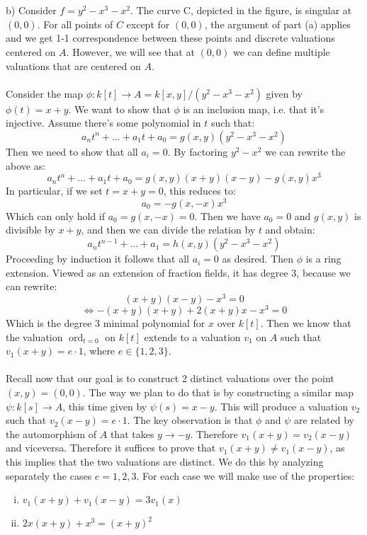 \documentclass[12 pt]{article}
\DeclareMathOperator{\ord}{ord}
\begin{document}
\\
\\
b) Consider $f = y^2 - x^3 - x^2$. The curve C, depicted in the figure, is singular at $(0,0)$. For all points of $C$ except for $(0,0)$, the argument of part (a) applies and we get 1-1 correspondence between these points and discrete valuations centered on $A$. However, we will see that at $(0,0)$ we can define multiple valuations that are centered on $A$.
\\
\\
Consider the map $\phi : k[t] \to A = k[x,y]/(y^2 - x^3 - x^2)$ given by $\phi(t) = x+y$. We want to show that $\phi$ is an inclusion map, i.e. that it's injective. Assume there's some polynomial in $t$ such that:
\[       a_n t^n + \dots + a_1 t + a_0 = g(x,y) (y^2 - x^3 - x^2)        \]
Then we need to show that all $a_i = 0$. By factoring $y^2 - x^2$ we can rewrite the above as:
\[          a_n t^n + \dots + a_1 t + a_0 = g(x,y) (x+y)(x-y) - g(x,y) x^3        \]
In particular, if we set $t = x+y = 0$, this reduces to:
\[       a_0 = - g(x, -x) x^3     \]
Which can only hold if $a_0 = g(x, -x) = 0$. Then we have $a_0 = 0$ and $g(x,y)$ is divisible by $x+y$, and then we can divide the relation by $t$ and obtain:
\[        a_n t^{n-1} + \dots + a_1 = h(x,y) (y^2 - x^3 - x^2)           \]
Proceeding by induction it follows that all $a_i = 0$ as desired. Then $\phi$ is a ring extension. Viewed as an extension of fraction fields, it has degree 3, because we can rewrite:
\[               (x+y)(x-y) - x^3 = 0             \]
\[        \Leftrightarrow - (x+y)(x+y) + 2(x+y) x - x^3 = 0      \]
Which is the degree 3 minimal polynomial for $x$ over $k[t]$. Then we know that the valuation $\ord_{t=0}$ on $k[t]$ extends to a valuation $v_1$ on $A$ such that $v_1(x+y) = e \cdot 1$, where $e \in \{1,2,3\}$. 
\\
\\
Recall now that our goal is to construct 2 distinct valuations over the point $(x,y) = (0,0)$. The way we plan to do that is by constructing a similar map $\psi : k[s] \to A$, this time given by $\psi(s) = x-y$. This will produce a valuation $v_2$ such that $v_2(x-y) = e \cdot 1$. The key observation is that $\phi$ and $\psi$ are related by the automorphism of $A$ that takes $y \to -y$. Therefore $v_1(x+y) = v_2(x-y)$ and viceversa. Therefore it suffices to prove that $v_1(x+y) \neq v_1(x-y)$, as this implies that the two valuations are distinct. We do this by analyzing separately the cases $e = 1,2,3$. For each case we will make use of the properties:
\begin{enumerate} [(i)]
\item $v_1(x+y) + v_1(x-y) = 3v_1(x)$
\item $2x(x+y) + x^3 = (x+y)^2$
\end{enumerate}
\end{document}
